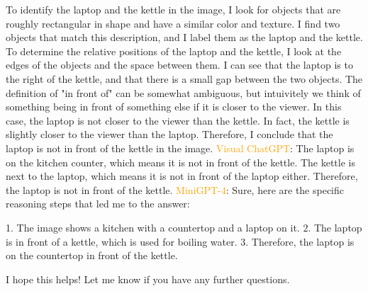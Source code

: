 \begin{enumerate}
    To identify the laptop and the kettle in the image, I look for objects that are roughly rectangular in shape and have a similar color and texture. I find two objects that match this description, and I label them as the laptop and the kettle.
    To determine the relative positions of the laptop and the kettle, I look at the edges of the objects and the space between them. I can see that the laptop is to the right of the kettle, and that there is a small gap between the two objects.
    The definition of "in front of" can be somewhat ambiguous, but intuivitely we think of something being in front of something else if it is closer to the viewer. In this case, the laptop is not closer to the viewer than the kettle. In fact, the kettle is slightly closer to the viewer than the laptop.
    Therefore, I conclude that the laptop is not in front of the kettle in the image.
    \subitem \textcolor{orange}{Visual ChatGPT}: The laptop is on the kitchen counter, which means it is not in front of the kettle. The kettle is next to the laptop, which means it is not in front of the laptop either. Therefore, the laptop is not in front of the kettle.
    \subitem \textcolor{orange}{MiniGPT-4}: Sure, here are the specific reasoning steps that led me to the answer:

    1. The image shows a kitchen with a countertop and a laptop on it.
    2. The laptop is in front of a kettle, which is used for boiling water.
    3. Therefore, the laptop is on the countertop in front of the kettle.
    
    I hope this helps! Let me know if you have any further questions.
\end{enumerate}
